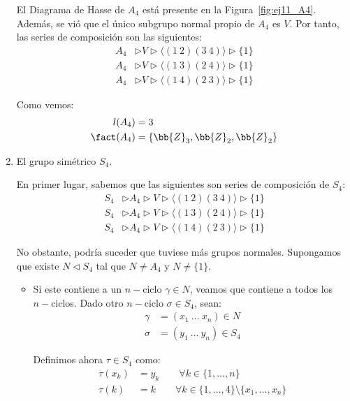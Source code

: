 \begin{ejercicio}
\begin{enumerate}
        El Diagrama de Hasse de $A_4$ está presente en la Figura~\ref{fig:ej11_A4}. Además, se vió que el único subgrupo normal propio de $A_4$ es $V$. Por tanto, las series de composición son las siguientes:
        \begin{align*}
            A_4 &\rhd V \rhd \langle (1\ 2)(3\ 4) \rangle  \rhd \{1\} \\
            A_4 &\rhd V \rhd \langle (1\ 3)(2\ 4) \rangle  \rhd \{1\} \\
            A_4 &\rhd V \rhd \langle (1\ 4)(2\ 3) \rangle  \rhd \{1\}
        \end{align*}

        Como vemos:
        \begin{align*}
            l(A_4) &= 3 \\
            \fact(A_4) &= \{\bb{Z}_3, \bb{Z}_2, \bb{Z}_2\}
        \end{align*}
        \item El grupo simétrico $S_4$.
        
        En primer lugar, sabemos que las siguientes son series de composición de $S_4$:
        \begin{align*}
            S_4 &\rhd A_4 \rhd V \rhd \langle (1\ 2)(3\ 4) \rangle  \rhd \{1\} \\
            S_4 &\rhd A_4 \rhd V \rhd \langle (1\ 3)(2\ 4) \rangle  \rhd \{1\} \\
            S_4 &\rhd A_4 \rhd V \rhd \langle (1\ 4)(2\ 3) \rangle  \rhd \{1\}
        \end{align*}

        No obstante, podría suceder que tuviese más grupos normales. Supongamos que existe $N\lhd S_4$ tal que $N\neq A_4$ y $N\neq \{1\}$.
        \begin{itemize}
            \item Si este contiene a un $n-$ciclo $\gamma\in N$, veamos que contiene a todos los $n-$ciclos. Dado otro $n-$ciclo $\sigma\in S_4$, sean:
            \begin{align*}
                \gamma &= (x_1\ \dots\ x_n)\in N \\
                \sigma &= (y_1\ \dots\ y_n)\in S_4
            \end{align*}

            Definimos ahora $\tau\in S_4$ como:
            \begin{align*}
                \tau(x_k) &= y_k\qquad \forall k\in \{1,\ldots,n\} \\
                \tau(k) &= k\qquad \forall k\in \{1,\ldots,4\}\setminus\{x_1,\ldots,x_n\}
            \end{align*}


\end{itemize}
\end{enumerate}
\end{ejercicio}
